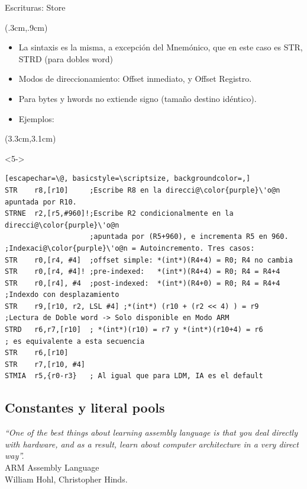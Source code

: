 \documentclass[usenames,table,dvipsnames,aspectratio=169]{beamer}
\newcommand{\Cshadowbox}[3][ShadowColor]{%
\begin{tcolorbox}[
  enhanced jigsaw,
  rounded corners,
  colframe=#2,
  colback=#2!5,
  drop fuzzy shadow=#1
]
#3
\end{tcolorbox}
}
\begin{document}
\begin{frame}[fragile]{Escrituras: Store}
 \begin{textblock*}{\textwidth}(.3cm,.9cm)
  \begin{itemize}[<+(1)->] \justifying
   \item La sintaxis es la misma, a excepción del Mnemónico, que en este caso es STR, STRD (para dobles word)
   \item Modos de direccionamiento: Offset inmediato, y Offset Registro.
   \item Para bytes y hwords no extiende signo (tamaño destino idéntico).
   \item Ejemplos:
  \end{itemize}
 \end{textblock*}
 \begin{textblock*}{\textwidth}(3.3cm,3.1cm)
  \begin{onlyenv}<5->
   \begin{lstlisting}[escapechar=\@, basicstyle=\scriptsize, backgroundcolor=,]
STR    r8,[r10]     ;Escribe R8 en la direcci@\color{purple}\'o@n apuntada por R10.
STRNE  r2,[r5,#960]!;Escribe R2 condicionalmente en la direcci@\color{purple}\'o@n 
                    ;apuntada por (R5+960), e incrementa R5 en 960.
;Indexaci@\color{purple}\'o@n = Autoincremento. Tres casos:
STR    r0,[r4, #4]  ;offset simple: *(int*)(R4+4) = R0; R4 no cambia
STR    r0,[r4, #4]! ;pre-indexed:   *(int*)(R4+4) = R0; R4 = R4+4
STR    r0,[r4], #4  ;post-indexed:  *(int*)(R4+0) = R0; R4 = R4+4
;Indexdo con desplazamiento
STR    r9,[r10, r2, LSL #4] ;*(int*) (r10 + (r2 << 4) ) = r9
;Lectura de Doble word -> Solo disponible en Modo ARM
STRD   r6,r7,[r10]  ; *(int*)(r10) = r7 y *(int*)(r10+4) = r6
; es equivalente a esta secuencia
STR    r6,[r10]
STR    r7,[r10, #4]
STMIA  r5,{r0-r3}   ; Al igual que para LDM, IA es el default      
   \end{lstlisting}
  \end{onlyenv}
 \end{textblock*}
\end{frame}

\subsection{Constantes y literal pools}
\begin{frame}
  \Cshadowbox[white!10!black]{blue!80!black}{\justifying
   \justifying
   \textit{``One of the best things about learning assembly language is that you deal directly with hardware, and as a result, learn about computer architecture in a very direct way''.}\\
   \vspace*{0.3cm}
   \hfill ARM Assembly Language\\
   \hfill William Hohl, Christopher Hinds.
  }
\end{frame}
\end{document}
